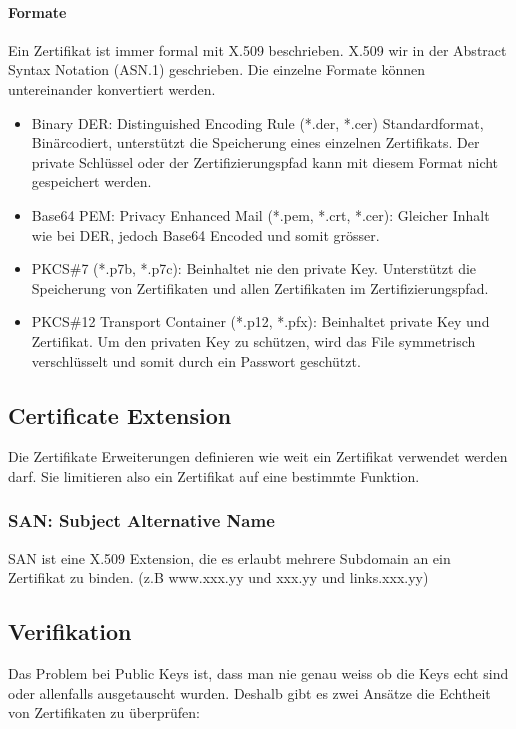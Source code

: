 \paragraph{Formate}
Ein Zertifikat ist immer formal mit X.509 beschrieben. X.509 wir in der Abstract Syntax Notation (ASN.1) geschrieben. Die einzelne Formate können untereinander konvertiert werden.
\begin{itemize}
	\item Binary DER: Distinguished Encoding Rule (*.der, *.cer) Standardformat, Binärcodiert, unterstützt die Speicherung eines einzelnen Zertifikats. Der private Schlüssel oder der Zertifizierungspfad kann mit diesem Format nicht gespeichert werden.
	\item Base64 PEM: Privacy Enhanced Mail (*.pem, *.crt, *.cer): Gleicher Inhalt wie bei DER, jedoch Base64 Encoded und somit grösser.
	\item PKCS\#7 (*.p7b, *.p7c): Beinhaltet nie den private Key. Unterstützt die Speicherung von Zertifikaten und allen Zertifikaten im Zertifizierungspfad.
	\item PKCS\#12 Transport Container (*.p12, *.pfx): Beinhaltet private Key und Zertifikat. Um den privaten Key zu schützen, wird das File symmetrisch verschlüsselt und somit durch ein Passwort geschützt. 
\end{itemize}

\subsection{Certificate Extension}
Die Zertifikate Erweiterungen definieren wie weit ein Zertifikat verwendet werden darf. Sie limitieren also ein Zertifikat auf eine bestimmte Funktion.

\subsubsection{SAN: Subject Alternative Name}
SAN ist eine X.509 Extension, die es erlaubt mehrere Subdomain an ein Zertifikat zu binden. (z.B www.xxx.yy und xxx.yy und links.xxx.yy)

\subsection{Verifikation}
Das Problem bei Public Keys ist, dass man nie genau weiss ob die Keys echt sind oder allenfalls ausgetauscht wurden. Deshalb gibt es zwei Ansätze die Echtheit von Zertifikaten zu überprüfen:

